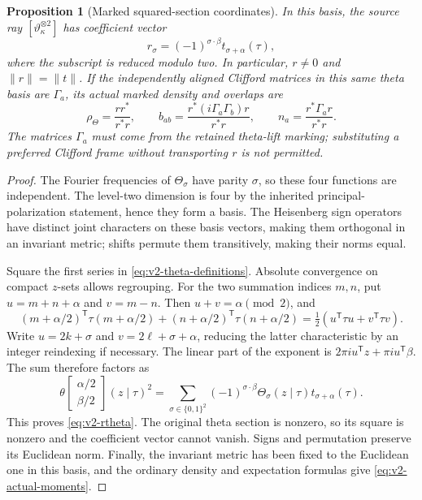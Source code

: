 \documentclass[11pt]{article}
\newtheorem{proposition}[proposition]{Proposition}
\theoremstyle{definition}
\theoremstyle{remark}
\newcommand{\norm}[1]{\lVert#1\rVert}
\begin{document}
\begin{proposition}[Marked squared-section coordinates]
\label{prop:v2-theta-coordinates}
In this basis, the source ray $[\vartheta_\kappa^{\otimes2}]$ has coefficient
vector
\begin{equation}
 \boxed{r_\sigma=(-1)^{\sigma\cdot\beta}
                    t_{\sigma+\alpha}(\tau),}
 \label{eq:v2-rtheta}
\end{equation}
where the subscript is reduced modulo two. In particular, $r\ne0$ and
$\norm r=\norm t$. If the independently aligned Clifford matrices in this
same theta basis are $\Gamma_a$, its actual marked density and overlaps are
\begin{equation}
 \boxed{\rho_\Theta=\frac{rr^*}{r^*r},\qquad
 b_{ab}=\frac{r^*(i\Gamma_a\Gamma_b)r}{r^*r},\qquad
 n_a=\frac{r^*\Gamma_a r}{r^*r}.}
 \label{eq:v2-actual-moments}
\end{equation}
The matrices $\Gamma_a$ must come from the retained theta-lift marking;
substituting a preferred Clifford frame without transporting $r$ is not
permitted.
\end{proposition}
\begin{proof}
The Fourier frequencies of $\Theta_\sigma$ have parity $\sigma$, so these
four functions are independent. The level-two dimension is four by the
inherited principal-polarization statement, hence they form a basis. The
Heisenberg sign operators have distinct joint characters on these basis
vectors, making them orthogonal in an invariant metric; shifts permute them
transitively, making their norms equal.

Square the first series in \eqref{eq:v2-theta-definitions}. Absolute
convergence on compact $z$-sets allows regrouping. For the two summation
indices $m,n$, put $u=m+n+\alpha$ and $v=m-n$. Then
$u+v=\alpha\pmod2$, and
\[
 (m+\alpha/2)^{\mathsf T}\tau(m+\alpha/2)
 +(n+\alpha/2)^{\mathsf T}\tau(n+\alpha/2)
 =\tfrac12(u^{\mathsf T}\tau u+v^{\mathsf T}\tau v).
\]
Write $u=2k+\sigma$ and $v=2\ell+\sigma+\alpha$, reducing the latter
characteristic by an integer reindexing if necessary. The linear part of
the exponent is $2\pi i u^{\mathsf T}z+\pi i u^{\mathsf T}\beta$.
The sum therefore factors as
\begin{equation}
 \theta\!\begin{bmatrix}\alpha/2\\\beta/2\end{bmatrix}(z\mid\tau)^2
 =\sum_{\sigma\in\{0,1\}^2}
 (-1)^{\sigma\cdot\beta}
 \Theta_\sigma(z\mid\tau)t_{\sigma+\alpha}(\tau).
 \label{eq:v2-addition}
\end{equation}
This proves \eqref{eq:v2-rtheta}. The original theta section is nonzero, so
its square is nonzero and the coefficient vector cannot vanish. Signs and
permutation preserve its Euclidean norm. Finally, the invariant metric has
been fixed to the Euclidean one in this basis, and the ordinary density and
expectation formulas give \eqref{eq:v2-actual-moments}.
\end{proof}
\end{document}
